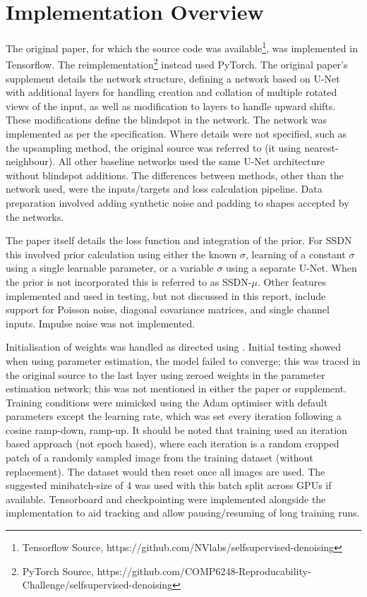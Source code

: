 \documentclass{article} %
\begin{document}
\section{Implementation Overview}
\label{sec:implementation}
The original paper, for which the source code was available\footnote{Tensorflow Source, https://github.com/NVlabs/selfsupervised-denoising}, was implemented in Tensorflow. The reimplementation\footnote{PyTorch Source, https://github.com/COMP6248-Reproducability-Challenge/selfsupervised-denoising} instead used PyTorch. The original paper's supplement details the network structure, defining a network based on U-Net \citep{unet} with additional layers for handling creation and collation of multiple rotated views of the input, as well as modification to layers to handle upward shifts. These modifications define the blindspot in the network. The network was implemented as per the specification. Where details were not specified, such as the upsampling method, the original source was referred to (it using nearest-neighbour). All other baseline networks used the same U-Net architecture without blindspot additions. The differences between methods, other than the network used, were the inputs/targets and loss calculation pipeline. Data preparation involved adding synthetic noise and padding to shapes accepted by the networks.

The paper itself details the loss function and integration of the prior. For SSDN this involved prior calculation using either the known $\sigma$, learning of a constant $\sigma$ using a single learnable parameter, or a variable $\sigma$ using a separate U-Net. When the prior is not incorporated this is referred to as SSDN-$\mu$. Other features implemented and used in testing, but not discussed in this report, include support for Poisson noise, diagonal covariance matrices, and single channel inputs. Impulse noise was not implemented. 

Initialisation of weights was handled as directed using \cite{he2015delving}. Initial testing showed when using parameter estimation, the model failed to converge; this was traced in the original source to the last layer using zeroed weights in the parameter estimation network; this was not mentioned in either the paper or supplement. Training conditions were mimicked using the Adam optimiser with default parameters except the learning rate, which was set every iteration following a cosine ramp-down, ramp-up. It should be noted that training used an iteration based approach (not epoch based), where each iteration is a random cropped patch of a randomly sampled image from the training dataset (without replacement). The dataset would then reset once all images are used. The suggested minibatch-size of 4 was used with this batch split across GPUs if available. Tensorboard and checkpointing were implemented alongside the implementation to aid tracking and allow pausing/resuming of long training runs.
\end{document}

